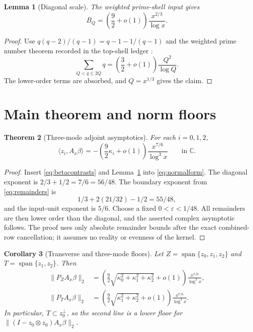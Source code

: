 \documentclass[10pt]{article}
\newtheorem{theorem}{Theorem}
\newtheorem{lemma}[theorem]{Lemma}
\newtheorem{corollary}[theorem]{Corollary}
\newcommand{\C}{\mathbb C}
\newcommand{\ip}[2]{\langle #1,#2\rangle}
\newcommand{\Ax}{A_x}
\newcommand{\e}{\varepsilon}
\begin{document}
\begin{lemma}[Diagonal scale]\label{lem:bq}
The weighted prime-shell input gives
\[
 B_Q=\left(\frac92+o(1)\right)\frac{x^{2/3}}{\log x}.
\]
\end{lemma}

\begin{proof}
Use \(q(q-2)/(q-1)=q-1-1/(q-1)\) and the weighted prime number theorem
recorded in the top-shell ledger \cite{v59}:
\[
 \sum_{Q<q\leq2Q}q=\left(\frac32+o(1)\right)\frac{Q^2}{\log Q}.
\]
The lower-order terms are absorbed, and \(Q=x^{1/3}\) gives the claim.
\end{proof}

\section{Main theorem and norm floors}

\begin{theorem}[Three-mode adjoint asymptotics]\label{thm:main}
For each \(i=0,1,2\),
\begin{equation}
 \boxed{\displaystyle
 \ip{z_i}{\Ax\beta}
 =-\left(\frac92\kappa_i+o(1)\right)
   \frac{x^{7/6}}{\log^3x}}\qquad\text{in }\C.              \label{eq:scalar}
\end{equation}
\end{theorem}

\begin{proof}
Insert \eqref{eq:betacontrasts} and Lemma~\ref{lem:bq} into
\eqref{eq:normalform}.  The diagonal exponent is
\(2/3+1/2=7/6=56/48\).  The boundary exponent from \eqref{eq:remainders} is
\[
 1/3+2(21/32)-1/2=55/48,
\]
and the input-unit exponent is \(5/6\).  Choose a fixed
\(0<\e<1/48\).  All remainders are then lower order than the diagonal, and
the asserted complex asymptotic follows.  The proof uses only absolute
remainder bounds after the exact combined-row cancellation; it assumes no
reality or evenness of the kernel.
\end{proof}

\begin{corollary}[Transverse and three-mode floors]\label{cor:floors}
Let \(Z=\operatorname{span}\{z_0,z_1,z_2\}\) and
\(T=\operatorname{span}\{z_1,z_2\}\).  Then
\begin{align}
 \|P_Z\Ax\beta\|_2
 &=\left(\frac92\sqrt{\kappa_0^2+\kappa_1^2+\kappa_2^2}+o(1)\right)
   \frac{x^{7/6}}{\log^3x},                              \label{eq:zfloor}\\
 \|P_T\Ax\beta\|_2
 &=\left(\frac92\sqrt{\kappa_1^2+\kappa_2^2}+o(1)\right)
   \frac{x^{7/6}}{\log^3x}.                              \label{eq:tfloor}
\end{align}
In particular, \(T\subset z_0^\perp\), so the second line is a lower floor
for \(\|(I-z_0\otimes z_0)\Ax\beta\|_2\).
\end{corollary}
\end{document}
